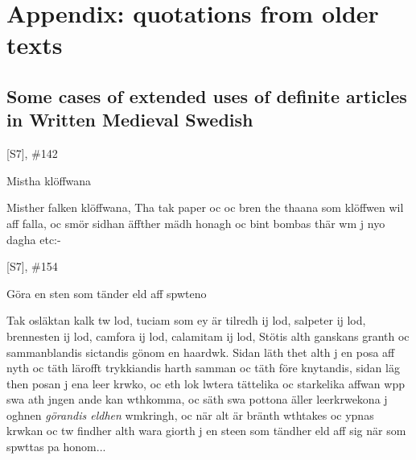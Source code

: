 
\chapter{Appendix: quotations from older texts}
\section{Some cases of extended uses of definite articles in Written Medieval Swedish}

[S7], \#142


Mistha klöffwana


Misther falken klöffwana, Tha tak paper oc  oc bren the thaana som klöffwen wil aff falla, oc smör sidhan äffther mädh honagh oc bint bombas thär wm j nyo dagha etc:-


[S7], \#154


Göra en sten som tänder eld aff spwteno 


Tak osläktan kalk tw lod, tuciam som ey är tilredh ij lod, salpeter ij lod, brennesten ij lod, camfora ij lod, calamitam ij lod, Stötis alth ganskans granth oc sammanblandis sictandis gönom en haardwk. Sidan läth thet alth j en posa aff nyth oc täth lärofft trykkiandis harth samman oc täth före knytandis, sidan läg then posan j ena leer krwko, oc eth lok lwtera tättelika oc starkelika affwan wpp swa ath jngen ande kan wthkomma, oc säth swa pottona äller leerkrwekona j oghnen \textit{görandis eldhen} wmkringh, oc när alt är bränth wthtakes oc ypnas krwkan oc tw findher alth wara giorth j en steen som tändher eld aff sig när som spwttas pa honom...

